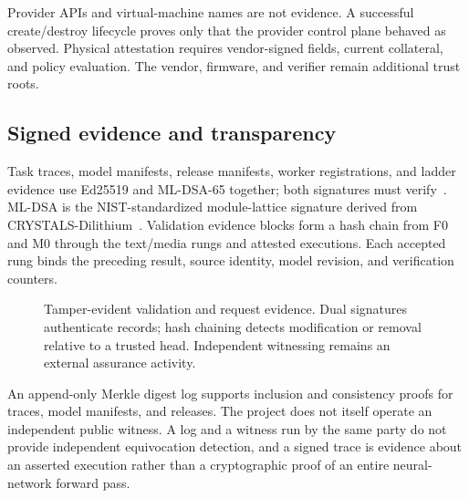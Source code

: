 Provider APIs and virtual-machine names are not evidence. A successful create/destroy lifecycle proves only that the provider control plane behaved as observed. Physical attestation requires vendor-signed fields, current collateral, and policy evaluation. The vendor, firmware, and verifier remain additional trust roots.

\subsection{Signed evidence and transparency}

Task traces, model manifests, release manifests, worker registrations, and ladder evidence use Ed25519 and ML-DSA-65 together; both signatures must verify~\cite{fips204}. ML-DSA is the NIST-standardized module-lattice signature derived from CRYSTALS-Dilithium~\cite{dilithium}. Validation evidence blocks form a hash chain from F0 and M0 through the text/media rungs and attested executions. Each accepted rung binds the preceding result, source identity, model revision, and verification counters.

\begin{figure}[htbp]
\centering

\caption{Tamper-evident validation and request evidence. Dual signatures authenticate records; hash chaining detects modification or removal relative to a trusted head. Independent witnessing remains an external assurance activity.}
\label{fig:evidence}
\end{figure}

An append-only Merkle digest log supports inclusion and consistency proofs for traces, model manifests, and releases. The project does not itself operate an independent public witness. A log and a witness run by the same party do not provide independent equivocation detection, and a signed trace is evidence about an asserted execution rather than a cryptographic proof of an entire neural-network forward pass.
